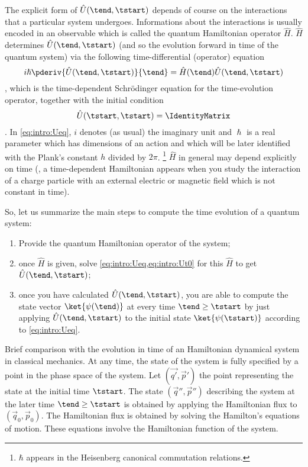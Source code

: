 The explicit  form of $\hat{U}(\tend, \tstart)$
depends of course on
the interactions that a particular system undergoes. Informations about the
interactions is usually encoded in an observable which is called the quantum Hamiltonian
operator $\hat{H}$.
$\hat{H}$ determines
$\hat{U}(\tend, \tstart)$ (and so the evolution forward in time of the quantum
system) via the following time-differential (operator) equation 
\begin{dmath}[label={intro:Ueq}]
   i\hslash \pderiv{\hat{U}(\tend, \tstart) }{\tend} = 
   \hat{H}(\tend) \hat{U}(\tend,\tstart)
\end{dmath},
which is the time-dependent Schr\"odinger equation for the time-evolution
operator, together with the initial condition 
\begin{dmath}[label={intro:Ut0}]
   \hat{U}(\tstart, \tstart) = \IdentityMatrix 
\end{dmath}.
In \cref{eq:intro:Ueq}, $i$ denotes (as usual) the imaginary unit and $\hslash$ is
a real parameter which has dimensions of an action and which will be later
identified with the Plank's constant $h$ divided by $2\pi$.%
\footnote{$\hbar$ appears in the Heisenberg canonical commutation relations.}
$\hat{H}$  in
general may depend explicitly on time (\eg, a time-dependent Hamiltonian appears
when you study the interaction of a charge particle with an external electric or
magnetic field which is not constant in time).

So, let us summarize the main steps to compute the time evolution of a quantum
system:
\begin{enumerate}
   \item\label{item:evolution:H} Provide the quantum Hamiltonian operator of the
      system;
   \item\label{item:evolution:U} once $\hat{H}$ is given, solve
      \cref{eq:intro:Ueq,eq:intro:Ut0} for this $\hat{H}$ to get $\hat{U}(\tend,
      \tstart)$;
   \item\label{item:evolution:applyU} once you have calculated $\hat{U}(\tend,
      \tstart)$, you are able to compute the state vector $\ket{\psi(\tend)}$ at
      every time $\tend \geq \tstart$ by just applying $\hat{U}(\tend, \tstart)$
      to the initial state $\ket{\psi(\tstart)}$ according to
      \cref{eq:intro:Ueq}.
\end{enumerate}

Brief comparison with the evolution in time of  an Hamiltonian dynamical system in classical mechanics.
At any time, the state of the system is fully specified by a point in the phase
space of the system.  Let $( \vec{q'}, \vec{p}')$ the point representing the
state at the initial time $\tstart$.  The state $(\vec{q}'', \vec{p}'')$
describing the system at the later time $\tend\geq \tstart$ is obtained by
applying the Hamiltonian flux to $(\vec{q}_{0}, \vec{p}_{0})$.  The Hamiltonian
flux is obtained by solving the Hamilton's equations of motion.  These equations
involve the Hamiltonian function of the system.


